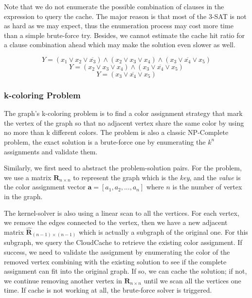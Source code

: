 Note that we do not enumerate the possible combination of clauses in the expression to query the cache. The major reason is that most of the 3-SAT is not as hard as we may expect, thus the enumeration process may cost more time than a simple brute-force try. Besides, we cannot estimate the cache hit ratio for a clause combination ahead which may make the solution even slower as well.

\begin{equation}
Y = (x_1 \vee x_2 \vee \overline{x_3}) \wedge (x_2 \vee x_3 \vee x_4) \wedge (x_3 \vee \overline{x_4} \vee x_5)
\label{eq:3-sat1}
\end{equation}
\begin{equation}
Y = (x_2 \vee x_3 \vee x_4) \wedge (x_3 \vee \overline{x_4} \vee x_5)
\label{eq:3-sat2}
\end{equation}
\begin{equation}
Y = (x_3 \vee \overline{x_4} \vee x_5)
\label{eq:3-sat3}
\end{equation}


\subsubsection{k-coloring Problem}
The graph's k-coloring problem is to find a color assignment strategy that mark the vertex of the graph so that no adjacent vertex share the same color by using no more than k different colors. The problem is also a classic NP-Complete problem, the exact solution is a brute-force one by enumerating the $k^n$ assignments and validate them.

Similarly, we first need to abstract the problem-solution pairs. For the problem, we use a matrix $\mathbf{R}_{n\times n}$ to represent the graph which is the \emph{key}, and the \emph{value} is the color assignment vector $\mathbf{a} = [a_1, a_2, ..., a_n]$ where $n$ is the number of vertex in the graph.

The kernel-solver is also using a linear scan to all the vertices. For each vertex, we remove the edges connected to the vertex, then we have a new adjacent matrix $\hat{\mathbf{R}}_{(n-1)\times (n-1)}$ which is actually a subgraph of the original one. For this subgraph, we query the CloudCache to retrieve the existing color assignment. If success, we need to validate the assignment by enumerating the color of the removed vertex combining with the existing solution to see if the complete assignment can fit into the original graph. If so, we can cache the solution; if not, we continue removing another vertex in $\mathbf{R}_{n\times n}$ until we scan all the vertices one time. If cache is not working at all, the brute-force solver is triggered. 
